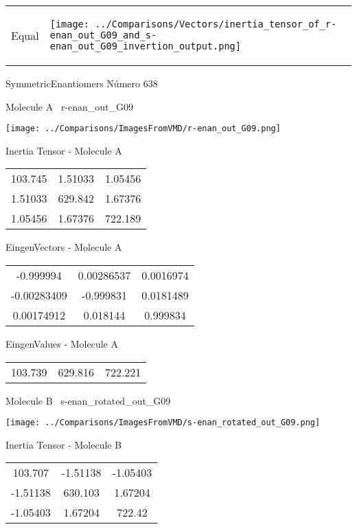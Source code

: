\vtab[-5mm]
\begin{tabular}{*{2}{m{}}}
\begin{center}
\textcolor{NavyBlue}{\Large Equal}
\end{center}
&
\begin{center}
\texttt{[image: ../Comparisons/Vectors/inertia\_tensor\_of\_r-enan\_out\_G09\_and\_s-enan\_out\_G09\_invertion\_output.png]}
\end{center}
\end{tabular}

 \newpage

\vtab[-3cm]
\begin{center}
{\large SymmetricEnantiomers \tab Número 638}
\end{center}
\begin{multicols}{2}
\begin{center}

Molecule A \
r-enan\_out\_G09

\texttt{[image: ../Comparisons/ImagesFromVMD/r-enan\_out\_G09.png]}

Inertia Tensor - Molecule A \\
\begin{tabular}{|c c c|}
103.745	 & 	1.51033	 & 	1.05456	 \\
1.51033	 & 	629.842	 & 	1.67376	 \\
1.05456	 & 	1.67376	 & 	722.189
\end{tabular}

\vtab
 EingenVectors - Molecule A     \\
\begin{tabular}{|c c c|}
-0.999994	 & 	0.00286537	 & 	0.0016974	 \\
-0.00283409	 & 	-0.999831	 & 	0.0181489	 \\
0.00174912	 & 	0.018144	 & 	0.999834
\end{tabular}

\vtab
 EingenValues - Molecule A     \\
\begin{tabular}{|c c c|}
103.739	 & 	629.816	 & 	722.221	 \\
\end{tabular}
\columnbreak

Molecule B \
s-enan\_rotated\_out\_G09

\texttt{[image: ../Comparisons/ImagesFromVMD/s-enan\_rotated\_out\_G09.png]}

Inertia Tensor - Molecule B \\
\begin{tabular}{|c c c|}
103.707	 & 	-1.51138	 & 	-1.05403	 \\
-1.51138	 & 	630.103	 & 	1.67204	 \\
-1.05403	 & 	1.67204	 & 	722.42
\end{tabular}


\end{center}
\end{multicols}
